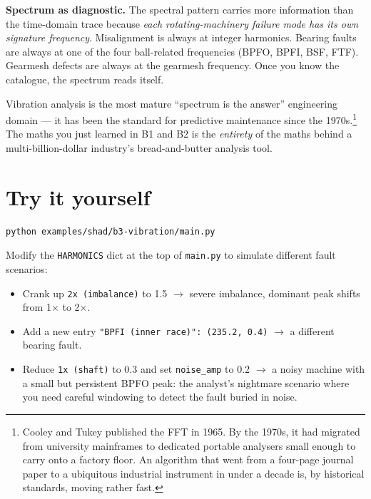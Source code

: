 \documentclass[11pt,a4paper,openany]{book}
\begin{document}
\textbf{Spectrum as diagnostic.} The spectral pattern carries more information
than the time-domain trace because \emph{each rotating-machinery failure mode
has its own signature frequency}. Misalignment is always at integer harmonics.
Bearing faults are always at one of the four ball-related frequencies (BPFO,
BPFI, BSF, FTF). Gearmesh defects are always at the gearmesh frequency. Once
you know the catalogue, the spectrum reads itself.

Vibration analysis is the most mature ``spectrum is the answer'' engineering
domain --- it has been the standard for predictive maintenance since the
1970s.\footnote{Cooley and Tukey published the FFT in 1965. By the 1970s, it
had migrated from university mainframes to dedicated portable analysers small
enough to carry onto a factory floor. An algorithm that went from a four-page
journal paper to a ubiquitous industrial instrument in under a decade is, by
historical standards, moving rather fast.}
The maths you just learned in B1 and B2 is the \emph{entirety} of the maths
behind a multi-billion-dollar industry's bread-and-butter analysis tool.

\section{Try it yourself}

\begin{lstlisting}[style=shaddata]
python examples/shad/b3-vibration/main.py
\end{lstlisting}

Modify the \texttt{HARMONICS} dict at the top of \texttt{main.py} to simulate
different fault scenarios:
\begin{itemize}[leftmargin=*,itemsep=0pt]
\item Crank up \texttt{2x (imbalance)} to 1.5 $\rightarrow$ severe imbalance,
  dominant peak shifts from 1$\times$ to 2$\times$.
\item Add a new entry \texttt{"BPFI (inner race)": (235.2, 0.4)} $\rightarrow$
  a different bearing fault.
\item Reduce \texttt{1x (shaft)} to 0.3 and set \texttt{noise\_amp} to 0.2
  $\rightarrow$ a noisy machine with a small but persistent BPFO peak: the
  analyst's nightmare scenario where you need careful windowing to detect the
  fault buried in noise.
\end{itemize}

\end{document}
